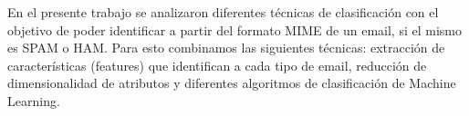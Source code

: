 En el presente trabajo se analizaron diferentes técnicas de clasificación con el objetivo de poder identificar a partir del formato MIME de un email, si el mismo es SPAM o HAM. Para esto combinamos las siguientes técnicas: extracción de características (features) que identifican a cada tipo de email, reducción de dimensionalidad de atributos y diferentes algoritmos de clasificación de Machine Learning.